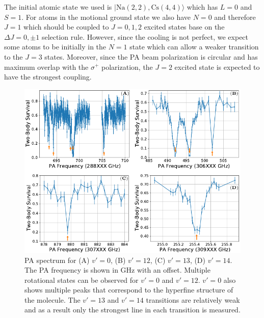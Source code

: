 The initial atomic state we used is $|\mathrm{Na(2, 2),Cs(4, 4)}\rangle$
which has $L=0$ and $S=1$.
For atoms in the motional ground state we also have $N=0$ and therefore $J=1$
which should be coupled to $J=0,1,2$ excited states base on the $\Delta J=0,\pm1$ selection rule.
However, since the cooling is not perfect,
we expect some atoms to be initially in the $N=1$ state which can allow a weaker
transition to the $J=3$ states.
Moreover, since the PA beam polarization is circular
and has maximum overlap with the $\sigma^+$ polarization,
the $J=2$ excited state is expected to have the strongest coupling.

\begin{figure}
  \centering
  \includegraphics[width=\textwidth]{figures/pa_spectrum.pdf}
  \caption[PA spectrum]{
    PA spectrum for (A) $v'=0$, (B) $v'=12$, (C) $v'=13$, (D) $v'=14$.
    The PA frequency is shown in GHz with an offset.
    Multiple rotational states can be observed for $v'=0$ and $v'=12$.
    $v'=0$ also shows multiple peaks that correspond to
    the hyperfine structure of the molecule.
    The $v'=13$ and $v'=14$ transitions are relatively weak
    and as a result only the strongest line in each transition is measured.
    \label{fig:pa:spectrum}}
\end{figure}

